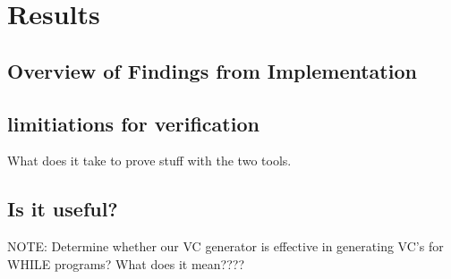\section{Results}

\subsection{Overview of Findings from Implementation}

\subsection{limitiations for verification}
What does it take to prove stuff with the two tools.

\subsection{Is it useful?}
NOTE: Determine whether our VC generator is effective in generating VC's for WHILE programs?
What does it mean????
